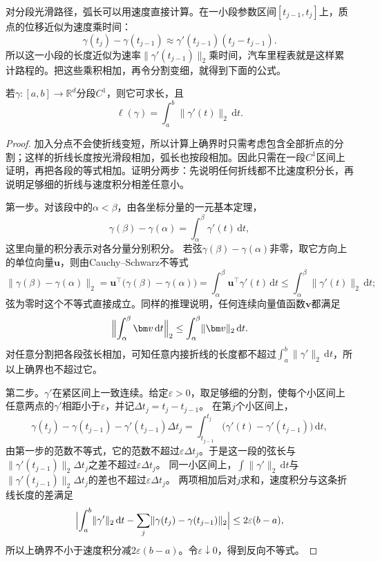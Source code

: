 对分段光滑路径，弧长可以用速度直接计算。在一小段参数区间$[t_{j-1},t_j]$上，质点的位移近似为速度乘时间：
\[
 \gamma(t_j)-\gamma(t_{j-1})\approx\gamma'(t_{j-1})(t_j-t_{j-1}).
\]
所以这一小段的长度近似为速率$\lVert\gamma'(t_{j-1})\rVert_2$乘时间，汽车里程表就是这样累计路程的。把这些乘积相加，再令分割变细，就得到下面的公式。
\begin{theorem}[分段光滑路径的弧长]
若$\gamma:[a,b]\to\mathbb R^d$分段$C^1$，则它可求长，且
\begin{equation}
 \ell(\gamma)=\int_a^b\lVert\gamma'(t)\rVert_2\,\mathrm dt.
\label{eq:analysis-arc-length-integral}
\end{equation}
\end{theorem}
\begin{proof}
加入分点不会使折线变短，所以计算上确界时只需考虑包含全部折点的分割；这样的折线长度按光滑段相加，弧长也按段相加。因此只需在一段$C^1$区间上证明，再把各段的等式相加。证明分两步：先说明任何折线都不比速度积分长，再说明足够细的折线与速度积分相差任意小。

第一步。对该段中的$\alpha<\beta$，由各坐标分量的一元基本定理，
\[
 \gamma(\beta)-\gamma(\alpha)=\int_\alpha^\beta\gamma'(t)\,\mathrm dt ,
\]
这里向量的积分表示对各分量分别积分。
若弦$\gamma(\beta)-\gamma(\alpha)$非零，取它方向上的单位向量$\bm u$，则由Cauchy--Schwarz不等式
\[
 \lVert\gamma(\beta)-\gamma(\alpha)\rVert_2
 =\bm u^\top\bigl(\gamma(\beta)-\gamma(\alpha)\bigr)
 =\int_\alpha^\beta\bm u^\top\gamma'(t)\,\mathrm dt
 \leq\int_\alpha^\beta\lVert\gamma'(t)\rVert_2\,\mathrm dt;
\]
弦为零时这个不等式直接成立。同样的推理说明，任何连续向量值函数$\bm v$都满足
\[
 \Bigl\lVert\int_\alpha^\beta\bm v\,\mathrm dt\Bigr\rVert_2\leq\int_\alpha^\beta\lVert\bm v\rVert_2\,\mathrm dt .
\]
对任意分割把各段弦长相加，可知任意内接折线的长度都不超过$\int_a^b\lVert\gamma'\rVert_2\,\mathrm dt$，所以上确界也不超过它。

第二步。$\gamma'$在紧区间上一致连续。给定$\varepsilon>0$，取足够细的分割，使每个小区间上任意两点的$\gamma'$相距小于$\varepsilon$，并记$\Delta t_j=t_j-t_{j-1}$。
在第$j$个小区间上，
\[
 \gamma(t_j)-\gamma(t_{j-1})-\gamma'(t_{j-1})\Delta t_j
 =\int_{t_{j-1}}^{t_j}\bigl(\gamma'(t)-\gamma'(t_{j-1})\bigr)\,\mathrm dt,
\]
由第一步的范数不等式，它的范数不超过$\varepsilon\Delta t_j$。于是这一段的弦长与$\lVert\gamma'(t_{j-1})\rVert_2\Delta t_j$之差不超过$\varepsilon\Delta t_j$。
同一小区间上，$\int\lVert\gamma'\rVert_2\,\mathrm dt$与$\lVert\gamma'(t_{j-1})\rVert_2\Delta t_j$的差也不超过$\varepsilon\Delta t_j$。
两项相加后对$j$求和，速度积分与这条折线长度的差满足
\[
 \Bigl|\int_a^b\lVert\gamma'\rVert_2\,\mathrm dt-\sum_{j}\lVert\gamma(t_j)-\gamma(t_{j-1})\rVert_2\Bigr|
 \leq2\varepsilon(b-a),
\]
所以上确界不小于速度积分减$2\varepsilon(b-a)$。令$\varepsilon\downarrow0$，得到反向不等式。
\end{proof}

